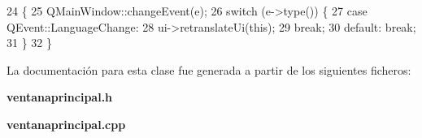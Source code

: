 \begin{DoxyCode}
24                                            \{
25     QMainWindow::changeEvent(e);
26     \textcolor{keywordflow}{switch} (e->type()) \{
27     \textcolor{keywordflow}{case} QEvent::LanguageChange:
28         ui->retranslateUi(\textcolor{keyword}{this});
29         \textcolor{keywordflow}{break};
30     \textcolor{keywordflow}{default}:    \textcolor{keywordflow}{break};
31     \}
32 \}
\end{DoxyCode}


La documentación para esta clase fue generada a partir de los siguientes ficheros\-:\begin{DoxyCompactItemize}
\item 
{\bf ventanaprincipal.\-h}\item 
{\bf ventanaprincipal.\-cpp}\end{DoxyCompactItemize}
